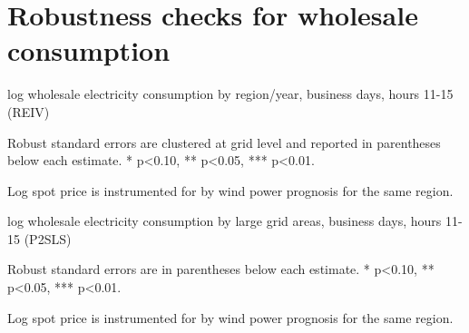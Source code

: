 \section{Robustness checks for wholesale consumption}
\label{app:robustness_wholesale}
\begin{table}[H]
\centering
\begin{threeparttable}
  \caption{log wholesale electricity consumption by region/year, business days, hours 11-15 (REIV)}
  \label{tab:ws_region_year}
  \footnotesize
    
    \begin{tablenotes}
    \item Robust standard errors are clustered at grid level and reported in parentheses below each estimate. * p<0.10, ** p<0.05, *** p<0.01.
    \item Log spot price is instrumented for by wind power prognosis for the same region.
  \end{tablenotes}
\end{threeparttable}
\end{table}

\begin{landscape}
\begin{table}[H]
\centering
\begin{threeparttable}
  \caption{log wholesale electricity consumption by large grid areas, business days, hours 11-15 (P2SLS)}
  \label{tab:ws_grids_large}
  \footnotesize
    
    \begin{tablenotes}
    \item Robust standard errors are in parentheses below each estimate. * p<0.10, ** p<0.05, *** p<0.01.
    \item Log spot price is instrumented for by wind power prognosis for the same region.
  \end{tablenotes}
\end{threeparttable}
\end{table}

\end{landscape}
